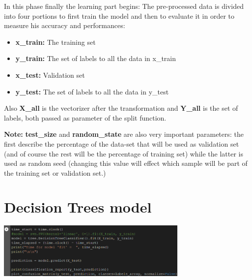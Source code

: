\documentclass[11pt]{scrartcl}
\begin{document}
{\noindent
\hspace{-0.05in}\large{
In this phase finally the learning part begins: \newline
The pre-processed data is divided into four portions to first train the model and then to evaluate it in order to measure his accuracy and performances:

\begin{itemize}
	\item \textbf{x\_train:} The training set
	\item \textbf{y\_train:} The set of labels to all the data in x\_train
	\item \textbf{x\_test:} Validation set
	\item \textbf{y\_test:} The set of labels to all the data in y\_test
\end{itemize}

\noindent
Also \textbf{X\_all} is the vectorizer after the transformation and \textbf{Y\_all} is the set of labels, both passed as parameter of the split function.
}

\vspace{0.5cm}

\noindent
\textbf{\large{Note:}}\large{ \newline
\textbf{test\_size} and \textbf{random\_state} are also very important parameters: the first describe the percentage of the data-set that will be used as validation set (and of course the rest will be the percentage of training set) while the latter is used as random seed (changing this value will effect which sample will be part of the training set or validation set.)
}
	


\newpage
\section{Decision Trees model}

\begin{center}
\vspace{0.2cm}
\hspace{+0.2in}\includegraphics[width=0.7\textwidth]{tree.png}
\vspace{0.1cm}


\end{center}}
\end{document}
